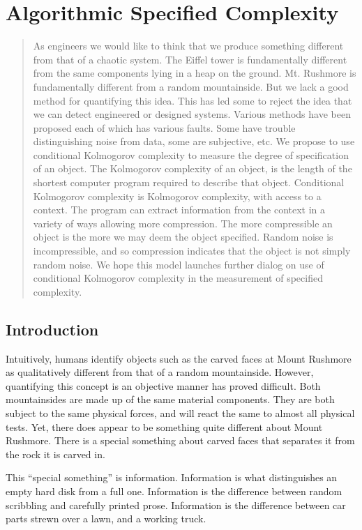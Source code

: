 \chapter{Algorithmic Specified Complexity}
\author{Winston Ewert, William A. Dembski, and Robert J. Marks II}

\begin{abstract}
As engineers we would like to think that we produce something different from that of a chaotic system. The Eiffel tower is  fundamentally different from the same components lying in a heap on the ground. Mt. Rushmore is fundamentally  different from a random mountainside. But we lack a good method for quantifying this idea. This has led some to reject the idea that we can detect engineered or designed systems. Various methods have been proposed each of which has
various faults. Some have trouble distinguishing noise from data, some are subjective, etc. We propose to use conditional Kolmogorov complexity to measure the degree of specification of an object. The Kolmogorov complexity of an object, is the length of the shortest computer program required to describe that object. Conditional Kolmogorov complexity is Kolmogorov complexity, with access to a  context. The program can extract information from the context in a variety of ways allowing more compression. The more compressible an object is the more we may deem the object specified. Random noise is  incompressible, and so compression indicates that the object is not simply random noise. 
We hope this model launches further dialog on use of conditional Kolmogorov complexity in the measurement of specified complexity.
\end{abstract}

\section{Introduction}
Intuitively, humans identify objects such as the carved faces at Mount Rushmore as qualitatively different from that of a random mountainside.
However, quantifying this concept is an objective manner has proved difficult.
Both mountainsides are made up of the same material components.
They are both subject to the same physical forces, and will react the same to almost all physical tests.
Yet, there does appear to be something quite different about Mount Rushmore.
There is a special something about carved faces that separates it from the rock it is carved in.

This ``special something'' is information.
Information is what distinguishes an empty hard disk from a full one.
Information is the difference between random scribbling and carefully printed prose.
Information is the difference between car parts strewn over a lawn, and a working truck.

